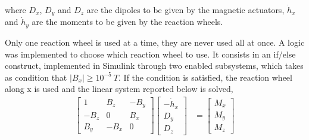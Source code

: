where $D_x$, $D_y$ and $D_z$ are the dipoles to be given by the magnetic actuators, $\Dot{h}_x$ and $\Dot{h}_y$ are the moments to be given by the reaction wheels.

Only one reaction wheel is used at a time, they are never used all at once. A logic was implemented to choose which reaction wheel to use. It consists in an if/else construct, implemented in Simulink through two enabled subsystems, which takes as condition that $|B_x|\geq 10^{-5} \ T$.
If the condition is satisfied, the reaction wheel along x is used and the linear system reported below is solved, 
\begin{equation}
\label{eq:syst1}
\begin{aligned} 
    \begin{bmatrix}
        1 & B_z & -B_y \\
        -B_z & 0 & B_x \\
        B_y & -B_x & 0 
    \end{bmatrix}\begin{bmatrix}
        -\Dot{h}_x \\
        D_y \\
        D_z
    \end{bmatrix} &=\begin{bmatrix}
        M_x \\
        M_y \\
        M_z
    \end{bmatrix}
\end{aligned}
\end{equation}

